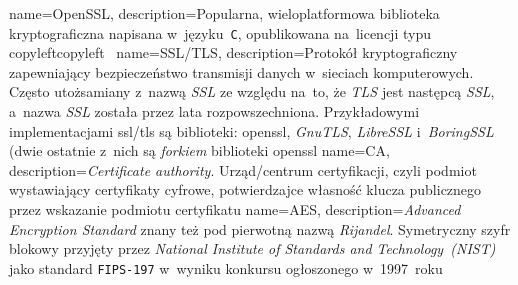 {
	name={OpenSSL},
	description={Popularna, wieloplatformowa biblioteka kryptograficzna napisana w~języku~\texttt{C}, opublikowana na~licencji typu \gls{copyleft}{copyleft}~\cite{openssl}}
}
{
	name={SSL/TLS},
	description={Protokół kryptograficzny zapewniający bezpieczeństwo transmisji danych w~sieciach komputerowych. Często utożsamiany z~nazwą \emph{SSL} ze względu na~to, że \emph{TLS} jest następcą \emph{SSL}, a~nazwa \emph{SSL} została przez lata rozpowszechniona. Przykładowymi implementacjami \gls{ssl/tls} są biblioteki: \gls{openssl}, \emph{GnuTLS}, \emph{LibreSSL} i~\emph{BoringSSL} (dwie ostatnie z~nich są \emph{forkiem} biblioteki \gls{openssl}}
}
{
	name={CA},
	description={\emph{Certificate authority}. Urząd/centrum certyfikacji, czyli podmiot wystawiający certyfikaty cyfrowe, potwierdzajce własność klucza publicznego przez wskazanie podmiotu certyfikatu}
}
{
	name={AES},
	description={\emph{Advanced Encryption Standard} znany też pod pierwotną nazwą \emph{Rijandel}. Symetryczny szyfr blokowy przyjęty przez \emph{National Institute of Standards and Technology~(NIST)} jako standard \texttt{FIPS-197} w~wyniku konkursu ogłoszonego w~1997~roku}
}
